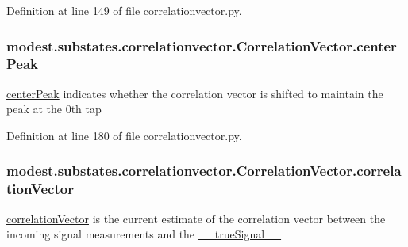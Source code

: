 Definition at line 149 of file correlationvector.\+py.

\subsubsection[{\texorpdfstring{center\+Peak}{centerPeak}}]{\setlength{\rightskip}{0pt plus 5cm}modest.\+substates.\+correlationvector.\+Correlation\+Vector.\+center\+Peak}\hypertarget{classmodest_1_1substates_1_1correlationvector_1_1CorrelationVector_a9dbc1cdcfab963b133537b54f0a6d7a6}{}\label{classmodest_1_1substates_1_1correlationvector_1_1CorrelationVector_a9dbc1cdcfab963b133537b54f0a6d7a6}


\hyperlink{classmodest_1_1substates_1_1correlationvector_1_1CorrelationVector_a9dbc1cdcfab963b133537b54f0a6d7a6}{center\+Peak} indicates whether the correlation vector is shifted to maintain the peak at the 0th tap 



Definition at line 180 of file correlationvector.\+py.

\subsubsection[{\texorpdfstring{correlation\+Vector}{correlationVector}}]{\setlength{\rightskip}{0pt plus 5cm}modest.\+substates.\+correlationvector.\+Correlation\+Vector.\+correlation\+Vector}\hypertarget{classmodest_1_1substates_1_1correlationvector_1_1CorrelationVector_a81da583ee9077067b6aaa354fd8a8c49}{}\label{classmodest_1_1substates_1_1correlationvector_1_1CorrelationVector_a81da583ee9077067b6aaa354fd8a8c49}


\hyperlink{classmodest_1_1substates_1_1correlationvector_1_1CorrelationVector_a81da583ee9077067b6aaa354fd8a8c49}{correlation\+Vector} is the current estimate of the correlation vector between the incoming signal measurements and the \hyperlink{classmodest_1_1substates_1_1correlationvector_1_1CorrelationVector_af2f52cea1c695f36dd100f529c322e94}{\+\_\+\+\_\+true\+Signal\+\_\+\+\_\+} 




